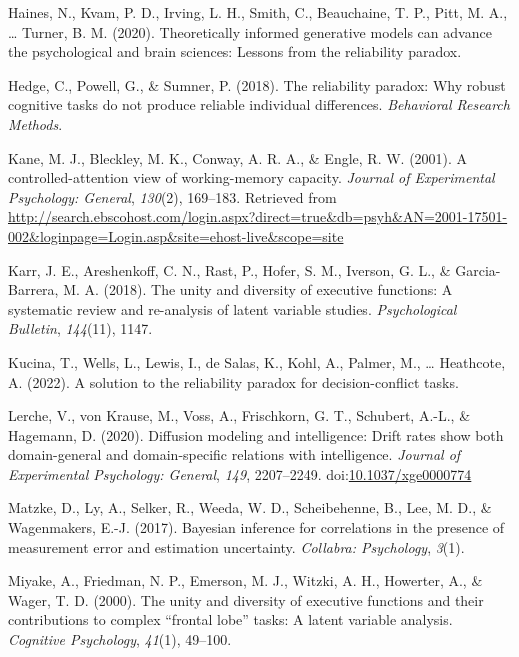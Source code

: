 \documentclass[
  ,man]{apa6}
\newlength{\cslhangindent}
\newlength{\cslentryspacingunit} %
\newenvironment{CSLReferences}[2] %
 {%
  \setlength{\parindent}{0pt}
  \ifodd #1
  \let\oldpar\par
  \def\par{\hangindent=\cslhangindent\oldpar}
  \fi
  \setlength{\parskip}{#2\cslentryspacingunit}
 }%
 {}
\begin{document}
\begin{CSLReferences}{1}{0}
\leavevmode{}%
Haines, N., Kvam, P. D., Irving, L. H., Smith, C., Beauchaine, T. P., Pitt, M. A., \ldots{} Turner, B. M. (2020). Theoretically informed generative models can advance the psychological and brain sciences: {Lessons} from the reliability paradox.

\leavevmode{}%
Hedge, C., Powell, G., \& Sumner, P. (2018). The reliability paradox: {Why} robust cognitive tasks do not produce reliable individual differences. \emph{Behavioral Research Methods}.

\leavevmode{}%
Kane, M. J., Bleckley, M. K., Conway, A. R. A., \& Engle, R. W. (2001). A controlled-attention view of working-memory capacity. \emph{Journal of Experimental Psychology: General}, \emph{130}(2), 169--183. Retrieved from \url{http://search.ebscohost.com/login.aspx?direct=true\&db=psyh\&AN=2001-17501-002\&loginpage=Login.asp\&site=ehost-live\&scope=site}

\leavevmode{}%
Karr, J. E., Areshenkoff, C. N., Rast, P., Hofer, S. M., Iverson, G. L., \& Garcia-Barrera, M. A. (2018). The unity and diversity of executive functions: {A} systematic review and re-analysis of latent variable studies. \emph{Psychological Bulletin}, \emph{144}(11), 1147.

\leavevmode{}%
Kucina, T., Wells, L., Lewis, I., de Salas, K., Kohl, A., Palmer, M., \ldots{} Heathcote, A. (2022). A solution to the reliability paradox for decision-conflict tasks.

\leavevmode{}%
Lerche, V., von Krause, M., Voss, A., Frischkorn, G. T., Schubert, A.-L., \& Hagemann, D. (2020). Diffusion modeling and intelligence: {Drift} rates show both domain-general and domain-specific relations with intelligence. \emph{Journal of Experimental Psychology: General}, \emph{149}, 2207--2249. doi:\href{https://doi.org/10.1037/xge0000774}{10.1037/xge0000774}

\leavevmode{}%
Matzke, D., Ly, A., Selker, R., Weeda, W. D., Scheibehenne, B., Lee, M. D., \& Wagenmakers, E.-J. (2017). Bayesian inference for correlations in the presence of measurement error and estimation uncertainty. \emph{Collabra: Psychology}, \emph{3}(1).

\leavevmode{}%
Miyake, A., Friedman, N. P., Emerson, M. J., Witzki, A. H., Howerter, A., \& Wager, T. D. (2000). The unity and diversity of executive functions and their contributions to complex {``frontal lobe''} tasks: {A} latent variable analysis. \emph{Cognitive Psychology}, \emph{41}(1), 49--100.


\end{CSLReferences}
\end{document}
